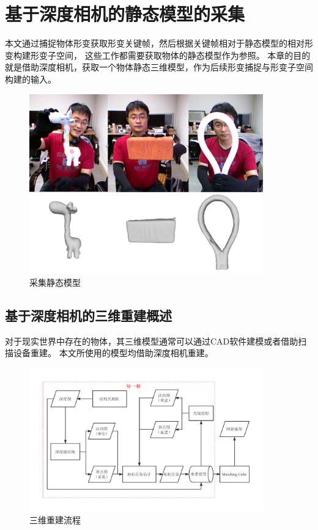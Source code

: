 \chapter{基于深度相机的静态模型的采集}

 本文通过捕捉物体形变获取形变关键帧，然后根据关键帧相对于静态模型的相对形变构建形变子空间，
 这些工作都需要获取物体的静态模型作为参照。
 本章的目的就是借助深度相机，获取一个物体静态三维模型，作为后续形变捕捉与形变子空间构建的输入。
\begin{figure}[h]
    \centering
    \includegraphics[width=0.9\textwidth]{./Pictures/static_mesh.eps}
    \caption{采集静态模型}
    \label{static_model}
\end{figure}

\section{基于深度相机的三维重建概述}
对于现实世界中存在的物体，其三维模型通常可以通过CAD软件建模或者借助扫描设备重建。
本文所使用的模型均借助深度相机重建。
\begin{figure}[h]
    \centering
    \includegraphics[width = 0.9\textwidth]{./Pictures/kf_pipeline_cropped.pdf}
    \caption{三维重建流程}
    \label{kfpipeline}
\end{figure}

